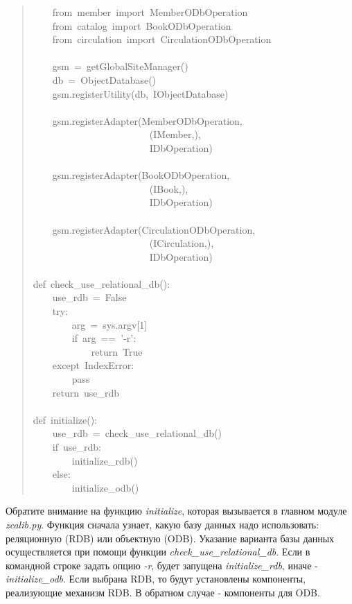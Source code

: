 \documentclass[a4paper,openany,twoside,final]{book}
\providecommand*{\DUroletitlereference}[1]{\textsl{#1}}
\begin{document}
\begin{quote}
{~~~~from~member~import~MemberODbOperation\\
~~~~from~catalog~import~BookODbOperation\\
~~~~from~circulation~import~CirculationODbOperation\\
~\\
~~~~gsm~=~getGlobalSiteManager()\\
~~~~db~=~ObjectDatabase()\\
~~~~gsm.registerUtility(db,~IObjectDatabase)\\
~\\
~~~~gsm.registerAdapter(MemberODbOperation,\\
~~~~~~~~~~~~~~~~~~~~~~~~(IMember,),\\
~~~~~~~~~~~~~~~~~~~~~~~~IDbOperation)\\
~\\
~~~~gsm.registerAdapter(BookODbOperation,\\
~~~~~~~~~~~~~~~~~~~~~~~~(IBook,),\\
~~~~~~~~~~~~~~~~~~~~~~~~IDbOperation)\\
~\\
~~~~gsm.registerAdapter(CirculationODbOperation,\\
~~~~~~~~~~~~~~~~~~~~~~~~(ICirculation,),\\
~~~~~~~~~~~~~~~~~~~~~~~~IDbOperation)\\
~\\
def~check\_use\_relational\_db():\\
~~~~use\_rdb~=~False\\
~~~~try:\\
~~~~~~~~arg~=~sys.argv{[}1{]}\\
~~~~~~~~if~arg~==~'-r':\\
~~~~~~~~~~~~return~True\\
~~~~except~IndexError:\\
~~~~~~~~pass\\
~~~~return~use\_rdb\\
~\\
def~initialize():\\
~~~~use\_rdb~=~check\_use\_relational\_db()\\
~~~~if~use\_rdb:\\
~~~~~~~~initialize\_rdb()\\
~~~~else:\\
~~~~~~~~initialize\_odb()
}
\end{quote}

Обратите внимание на функцию \DUroletitlereference{initialize}, которая вызывается в
главном модуле \DUroletitlereference{zcalib.py}.  Функция сначала узнает, какую базу данных
надо использовать: реляционную (RDB) или объектную (ODB).  Указание
варианта базы данных осуществляется при помощи функции
\DUroletitlereference{check\_use\_relational\_db}.  Если в командной строке задать опцию \DUroletitlereference{-r},
будет запущена \DUroletitlereference{initialize\_rdb}, иначе - \DUroletitlereference{initialize\_odb}.  Если
выбрана RDB, то будут установлены компоненты, реализующие механизм
RDB.  В обратном случае - компоненты для ODB.
\end{document}
